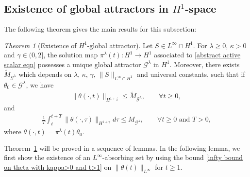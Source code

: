 \documentclass[reqno]{amsart}%
\theoremstyle{definition}
\theoremstyle{remark}
\numberwithin{equation}{section}
\newtheorem{theorem}{Theorem}
\newtheorem{remark}[theorem]{Remark}
\newcommand{\thetakappa}{\theta^{(\kappa)}}
\newcommand{\1}{\mathbf{1}}
\newcommand{\Gg}{\mathcal{G}^{\lambda}}
\newcommand{\pin}{\pi^{\lambda}}
\numberwithin{equation}{section}
\numberwithin{theorem}{section}
\numberwithin{figure}{section}
\begin{document}

\subsection{Existence of global attractors in $H^1$-space}\label{existence of global attractors subsection}

The following theorem gives the main results for this subsection:

\begin{theorem}[Existence of $H^1$-global attractor]\label{Existence of H1 global attractor}
Let $S\in L^\infty\cap H^1$. For $\lambda\ge0$, $\kappa>0$ and $\gamma\in(0,2]$, the solution map $\pin(t):H^1\to H^1$ associated to \eqref{abstract active scalar eqn} possesses a unique global attractor $\Gg$ in $H^1$. Moreover, there exists $\tilde{M}_{\Gg}$ which depends on $\lambda$, $\kappa$, $\gamma$, $\|S\|_{L^\infty\cap H^1}$ and universal constants, such that if $\theta_0\in\Gg$, we have
\begin{align}\label{uniform bound on theta from the attractor} 
\|\theta(\cdot,t)\|_{H^{1+\frac{\gamma}{2}}}\le \tilde{M}_{\Gg},\qquad\forall t\ge0,
\end{align}
and
\begin{align}\label{uniform bound on time integral of theta from the attractor}
\frac{1}{T}\int_t^{t+T}\|\theta(\cdot,\tau)\|_{H^{1+\gamma}}d\tau\le M_{\Gg},\qquad \mbox{$\forall t\ge0$ and $T>0$,}
\end{align}
where $\theta(\cdot,t)=\pin(t)\theta_0$.
\end{theorem}


Theorem~\ref{Existence of H1 global attractor} will be proved in a sequence of lemmas. In the following lemma, we first show the existence of an $L^\infty$-absorbing set by using the bound \eqref{infty bound on theta with kappa>0 and t>1} on $\|\theta(t)\|_{L^\infty}$ for $t\ge1$.
\end{document}
